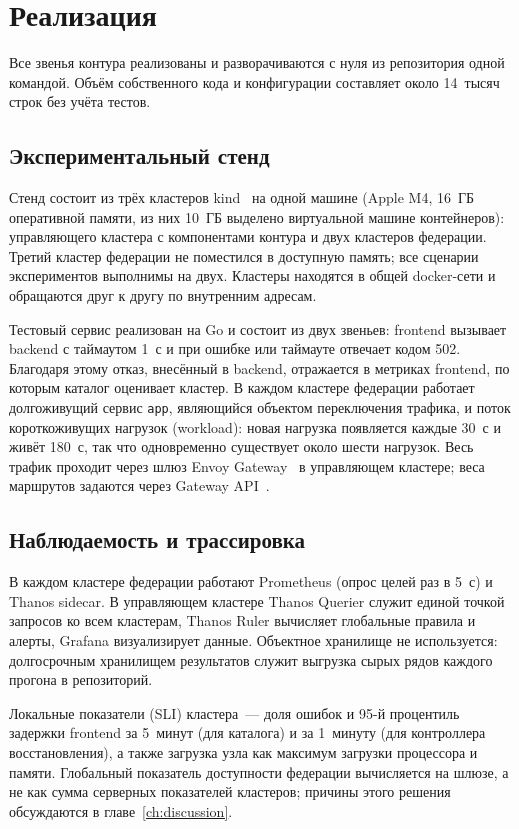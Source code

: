 \chapter{Реализация}

Все звенья контура реализованы и разворачиваются с нуля из репозитория одной
командой. Объём собственного кода и конфигурации составляет около 14~тысяч
строк без учёта тестов.

\section{Экспериментальный стенд}

Стенд состоит из трёх кластеров kind~\cite{kind} на одной машине (Apple M4,
16~ГБ оперативной памяти, из них 10~ГБ выделено виртуальной машине
контейнеров): управляющего кластера с компонентами контура и двух кластеров
федерации. Третий кластер федерации не поместился в доступную память; все
сценарии экспериментов выполнимы на двух. Кластеры находятся в общей
docker-сети и обращаются друг к другу по внутренним адресам.

Тестовый сервис реализован на Go и состоит из двух звеньев: frontend
вызывает backend с таймаутом 1~с и при ошибке или таймауте отвечает кодом
502. Благодаря этому отказ, внесённый в backend, отражается в метриках
frontend, по которым каталог оценивает кластер. В каждом кластере федерации
работает долгоживущий сервис \texttt{app}, являющийся объектом переключения
трафика, и поток короткоживущих нагрузок (workload): новая нагрузка
появляется каждые 30~с и живёт 180~с, так что одновременно существует около
шести нагрузок. Весь трафик проходит через шлюз Envoy
Gateway~\cite{envoy-gateway} в управляющем кластере; веса маршрутов задаются
через Gateway API~\cite{gateway-api}.

\section{Наблюдаемость и трассировка}

В каждом кластере федерации работают Prometheus (опрос целей раз в 5~с) и
Thanos sidecar. В управляющем кластере Thanos Querier служит единой точкой
запросов ко всем кластерам, Thanos Ruler вычисляет глобальные правила и
алерты, Grafana визуализирует данные. Объектное хранилище не используется:
долгосрочным хранилищем результатов служит выгрузка сырых рядов каждого
прогона в репозиторий.

Локальные показатели (SLI) кластера~--- доля ошибок и 95-й процентиль
задержки frontend за 5~минут (для каталога) и за 1~минуту (для контроллера
восстановления), а также загрузка узла как максимум загрузки процессора и
памяти. Глобальный показатель доступности федерации вычисляется на шлюзе,
а не как сумма серверных показателей кластеров; причины этого решения
обсуждаются в главе~\ref{ch:discussion}.


